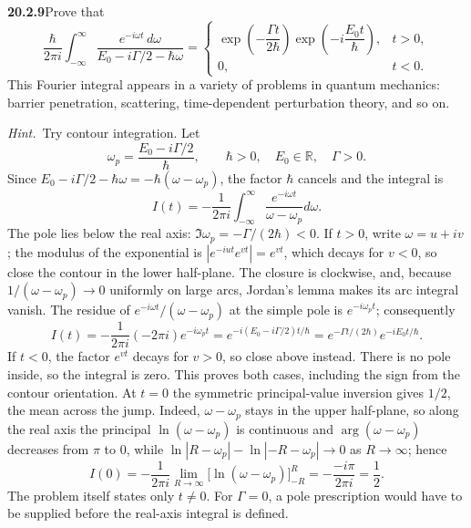 \par\bigskip
\noindent\textbf{20.2.9}\quad Prove that
\[
\frac{\hbar}{2\pi i}\int_{-\infty}^{\infty}
\frac{e^{-i\omega t}\,d\omega}{E_{0}-i\Gamma/2-\hbar\omega}
=\begin{cases}
\exp\left(-\dfrac{\Gamma t}{2\hbar}\right)
\exp\left(-i\dfrac{E_{0}t}{\hbar}\right), & t>0,\\[12pt]
0, & t<0.
\end{cases}
\]
This Fourier integral appears in a variety of problems in quantum
mechanics: barrier penetration, scattering, time-dependent
perturbation theory, and so on.
\par{}
\par\emph{Hint.}~Try contour integration.
\solution
Let
\[
\omega_p=\frac{E_0-i\Gamma/2}{\hbar},\qquad
\hbar>0,\quad E_0\in\mathbb R,\quad\Gamma>0.
\]
Since $E_0-i\Gamma/2-\hbar\omega=-\hbar(\omega-\omega_p)$, the
factor $\hbar$ cancels and the integral is
\[
I(t)=-\frac1{2\pi i}\int_{-\infty}^{\infty}
\frac{e^{-i\omega t}}{\omega-\omega_p}d\omega.
\]
The pole lies below the real axis: $\Im\omega_p=-\Gamma/(2\hbar)<0$.
If $t>0$, write $\omega=u+iv$; the modulus of the exponential is
$|e^{-iut}e^{vt}|=e^{vt}$, which decays for $v<0$,
so close the contour in the lower half-plane. The closure is
clockwise, and, because $1/(\omega-\omega_p)\to0$ uniformly on
large arcs, Jordan's lemma makes its arc integral vanish.
The residue of $e^{-i\omega t}/(\omega-\omega_p)$ at the simple
pole is $e^{-i\omega_pt}$; consequently
\[
I(t)=-\frac1{2\pi i}(-2\pi i)e^{-i\omega_pt}
=e^{-i(E_0-i\Gamma/2)t/\hbar}
=e^{-\Gamma t/(2\hbar)}e^{-iE_0t/\hbar}.
\]
If $t<0$, the factor $e^{vt}$ decays for $v>0$, so close above
instead. There is no pole inside, so the
integral is zero. This proves both cases, including the sign
from the contour orientation.
At $t=0$ the symmetric principal-value inversion gives $1/2$,
the mean across the jump. Indeed, $\omega-\omega_p$ stays in the
upper half-plane, so along the real axis the principal
$\ln(\omega-\omega_p)$ is continuous and $\arg(\omega-\omega_p)$
decreases from $\pi$ to $0$, while
$\ln|R-\omega_p|-\ln|{-R}-\omega_p|\to0$ as $R\to\infty$; hence
\[
I(0)=-\frac1{2\pi i}\lim_{R\to\infty}
\bigl[\ln(\omega-\omega_p)\bigr]_{-R}^{R}
=-\frac{-i\pi}{2\pi i}=\frac12.
\]
The problem itself states only $t\ne0$.
For $\Gamma=0$, a pole prescription would
have to be supplied before the real-axis integral is defined.

